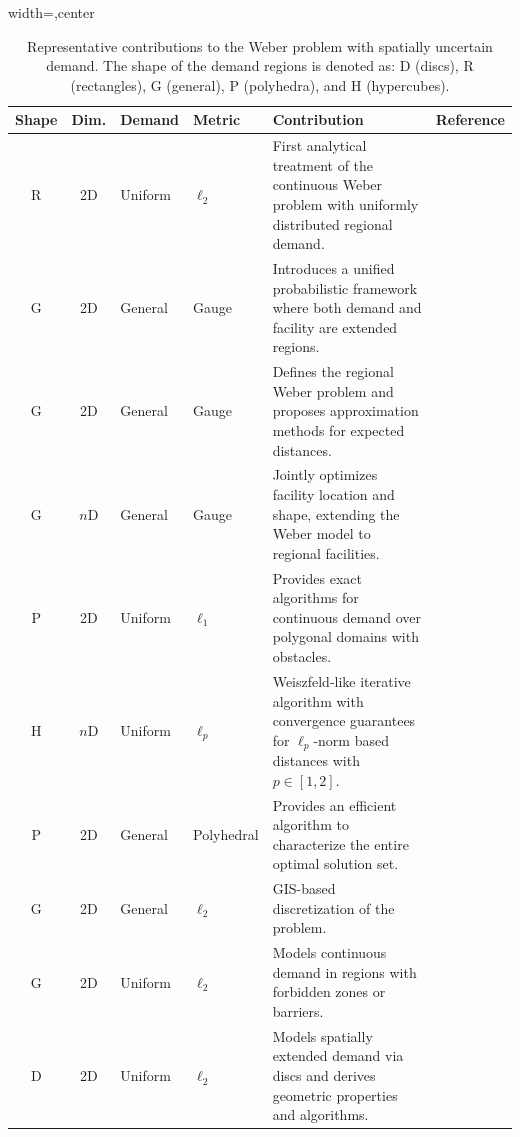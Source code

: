 \documentclass[letter,11pt, reqno]{amsart}
\renewcommand{\;}{\quad}
\theoremstyle{thmstyleone}%
\theoremstyle{thmstyletwo}%
\theoremstyle{thmstylethree}%
\begin{document}
\begin{table}[ht]
\centering
\renewcommand{\arraystretch}{1.1}
\setlength{\tabcolsep}{4pt}
\begin{adjustbox}{width=\textwidth,center}
\begin{tabular}{c c p{1.4cm} p{1.7cm} p{9cm} l}
\toprule
\textbf{Shape} & \textbf{Dim.} & \textbf{Demand} & \textbf{Metric} & \textbf{Contribution} & \textbf{Reference} \\
\midrule
R & 2D & Uniform & $\ell_2$ & First analytical treatment of the continuous Weber problem with \linebreak uniformly distributed regional demand. & \cite{love1972x} \\
G & 2D & General & Gauge & Introduces a unified probabilistic framework where both demand and facility are extended regions. & \cite{carrizosa1995generalized} \\
G & 2D & General & Gauge & Defines the regional Weber problem and proposes approximation methods for expected distances. & \cite{carrizosa1998weber} \\
G & $n$D & General & Gauge & Jointly optimizes facility location and shape, extending the Weber model to regional facilities. & \cite{carrizosa1998location} \\
P & 2D & Uniform & $\ell_1$ & Provides exact algorithms for continuous demand over polygonal domains with obstacles. & \cite{Fekete2005} \\
H & $n$D & Uniform & $\ell_p$ & Weiszfeld-like iterative algorithm with convergence guarantees for \linebreak $\ell_p$-norm based distances with $p \in [1,2]$. & \cite{valero2008single} \\
P & 2D & General & Polyhedral & Provides an efficient algorithm to characterize the entire optimal \linebreak solution set. & \cite{puerto2011structure} \\
G & 2D & General & $\ell_2$ & GIS-based discretization of the problem. & \cite{Yao2014} \\
G & 2D & Uniform & $\ell_2$ & Models continuous demand in regions with forbidden zones or \linebreak barriers. & \cite{ByrneKalcsics2022} \\
D & 2D & Uniform & $\ell_2$ & Models spatially extended demand via discs and derives geometric properties and algorithms. & \cite{kalczynski2025weber} \\
\bottomrule
\end{tabular}
\end{adjustbox}
\caption{Representative contributions to the Weber problem with spatially uncertain demand. The shape of the demand regions is denoted as: D (discs), R (rectangles), G (general), P (polyhedra), and H (hypercubes).}
\label{tab:review}
\end{table}
\end{document}
